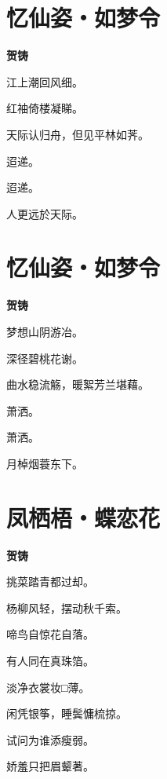 \documentclass[12pt,a4paper]{ctexbook}
\begin{document}
\section{忆仙姿・如梦令}
\textbf{贺铸}\par\vspace{0.5em}
江上潮回风细。\par
红袖倚楼凝睇。\par
天际认归舟，但见平林如荠。\par
迢递。\par
迢递。\par
人更远於天际。\par

\section{忆仙姿・如梦令}
\textbf{贺铸}\par\vspace{0.5em}
梦想山阴游冶。\par
深径碧桃花谢。\par
曲水稳流觞，暖絮芳兰堪藉。\par
萧洒。\par
萧洒。\par
月棹烟蓑东下。\par

\section{凤栖梧・蝶恋花}
\textbf{贺铸}\par\vspace{0.5em}
挑菜踏青都过却。\par
杨柳风轻，摆动秋千索。\par
啼鸟自惊花自落。\par
有人同在真珠箔。\par
淡净衣裳妆□薄。\par
闲凭银筝，睡鬓慵梳掠。\par
试问为谁添瘦弱。\par
娇羞只把眉颦著。\par
\end{document}
